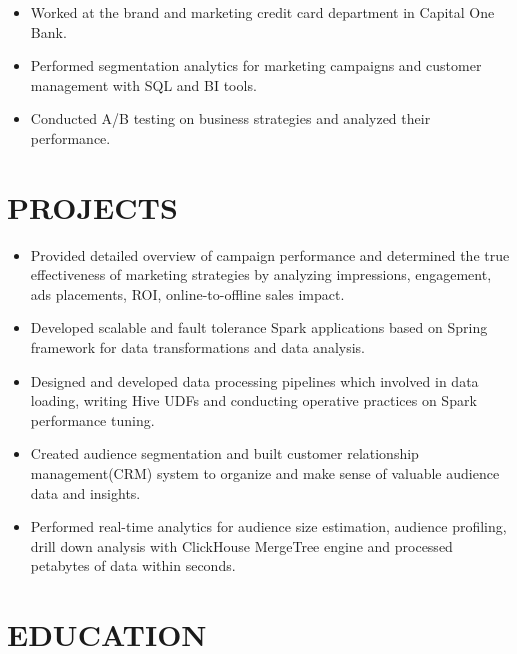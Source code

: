 \documentclass{resume}
\begin{document}
\begin{itemize}
  \item Worked at the brand and marketing credit card department in Capital One Bank.
  \item Performed segmentation analytics for marketing campaigns and customer management with SQL and BI tools.
  \item Conducted A/B testing on business strategies and analyzed their performance.
\end{itemize}

\section{PROJECTS}
\begin{itemize}
  \item Provided detailed overview of campaign performance and determined the true effectiveness of marketing strategies by analyzing impressions, engagement, ads placements, ROI, online-to-offline sales impact.
  \item Developed scalable and fault tolerance Spark applications based on Spring framework for data transformations and data analysis.
  \item Designed and developed data processing pipelines which involved in data loading, writing Hive UDFs and conducting operative practices on Spark performance tuning.
\end{itemize}

\begin{itemize}
  \item Created audience segmentation and built customer relationship management(CRM) system to organize and make sense of valuable audience data and insights.
  \item Performed real-time analytics for audience size estimation, audience profiling, drill down analysis with ClickHouse MergeTree engine and processed petabytes of data within seconds.
\end{itemize}

\section{EDUCATION}
\end{document}
